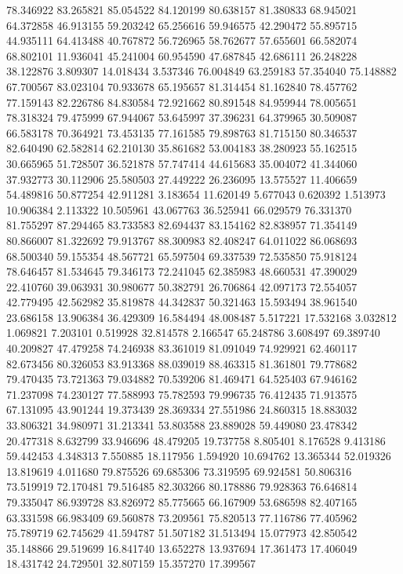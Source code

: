 78.346922
83.265821
85.054522
84.120199
80.638157
81.380833
68.945021
64.372858
46.913155
59.203242
65.256616
59.946575
42.290472
55.895715
44.935111
64.413488
40.767872
56.726965
58.762677
57.655601
66.582074
68.802101
11.936041
45.241004
60.954590
47.687845
42.686111
26.248228
38.122876
3.809307
14.018434
3.537346
76.004849
63.259183
57.354040
75.148882
67.700567
83.023104
70.933678
65.195657
81.314454
81.162840
78.457762
77.159143
82.226786
84.830584
72.921662
80.891548
84.959944
78.005651
78.318324
79.475999
67.944067
53.645997
37.396231
64.379965
30.509087
66.583178
70.364921
73.453135
77.161585
79.898763
81.715150
80.346537
82.640490
62.582814
62.210130
35.861682
53.004183
38.280923
55.162515
30.665965
51.728507
36.521878
57.747414
44.615683
35.004072
41.344060
37.932773
30.112906
25.580503
27.449222
26.236095
13.575527
11.406659
54.489816
50.877254
42.911281
3.183654
11.620149
5.677043
0.620392
1.513973
10.906384
2.113322
10.505961
43.067763
36.525941
66.029579
76.331370
81.755297
87.294465
83.733583
82.694437
83.154162
82.838957
71.354149
80.866007
81.322692
79.913767
88.300983
82.408247
64.011022
86.068693
68.500340
59.155354
48.567721
65.597504
69.337539
72.535850
75.918124
78.646457
81.534645
79.346173
72.241045
62.385983
48.660531
47.390029
22.410760
39.063931
30.980677
50.382791
26.706864
42.097173
72.554057
42.779495
42.562982
35.819878
44.342837
50.321463
15.593494
38.961540
23.686158
13.906384
36.429309
16.584494
48.008487
5.517221
17.532168
3.032812
1.069821
7.203101
0.519928
32.814578
2.166547
65.248786
3.608497
69.389740
40.209827
47.479258
74.246938
83.361019
81.091049
74.929921
62.460117
82.673456
80.326053
83.913368
88.039019
88.463315
81.361801
79.778682
79.470435
73.721363
79.034882
70.539206
81.469471
64.525403
67.946162
71.237098
74.230127
77.588993
75.782593
79.996735
76.412435
71.913575
67.131095
43.901244
19.373439
28.369334
27.551986
24.860315
18.883032
33.806321
34.980971
31.213341
53.803588
23.889028
59.449080
23.478342
20.477318
8.632799
33.946696
48.479205
19.737758
8.805401
8.176528
9.413186
59.442453
4.348313
7.550885
18.117956
1.594920
10.694762
13.365344
52.019326
13.819619
4.011680
79.875526
69.685306
73.319595
69.924581
50.806316
73.519919
72.170481
79.516485
82.303266
80.178886
79.928363
76.646814
79.335047
86.939728
83.826972
85.775665
66.167909
53.686598
82.407165
63.331598
66.983409
69.560878
73.209561
75.820513
77.116786
77.405962
75.789719
62.745629
41.594787
51.507182
31.513494
15.077973
42.850542
35.148866
29.519699
16.841740
13.652278
13.937694
17.361473
17.406049
18.431742
24.729501
32.807159
15.357270
17.399567
